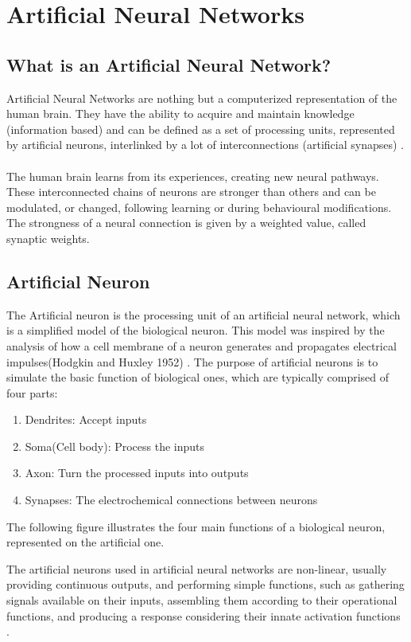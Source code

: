 \section{Artificial Neural Networks}
\subsection{What is an Artificial Neural Network?}
Artificial Neural Networks are nothing but a computerized representation of the human brain. 
They have the ability to acquire and maintain knowledge (information based) and can be defined as a set of processing units, represented by artificial neurons,
interlinked by a lot of interconnections
(artificial synapses) \cite[p.~5]{Silva2016}.\\\\
The human brain learns from its experiences, creating new neural pathways. These interconnected chains of neurons are stronger than others and can be modulated, or changed,
following learning or during behavioural modifications.
The strongness of a neural connection is given by a weighted value, called synaptic weights.

\subsection{Artificial Neuron}
The Artificial neuron is the processing unit of an artificial neural network, which is a simplified model of the biological neuron.
This model was inspired by the analysis of how a cell membrane of a neuron generates and propagates electrical impulses(Hodgkin and Huxley 1952) \cite[p.~11]{Silva2016}.
The purpose of artificial neurons is to simulate the basic function of biological ones,
which are typically comprised of four parts:

\begin{enumerate}
	\item Dendrites: Accept inputs
	\item Soma(Cell body): Process the inputs
	\item Axon: Turn the processed inputs into outputs
	\item Synapses: The electrochemical connections between neurons 
\end{enumerate}
The following figure illustrates the four main functions of a biological neuron, represented on the artificial one. 

The artificial neurons used in artificial neural networks are non-linear, usually providing continuous outputs,
and performing simple functions,
such as gathering signals available on their inputs,
assembling them according to their operational functions,
and producing a response considering their innate activation functions \cite[p.~11]{Silva2016}. 

